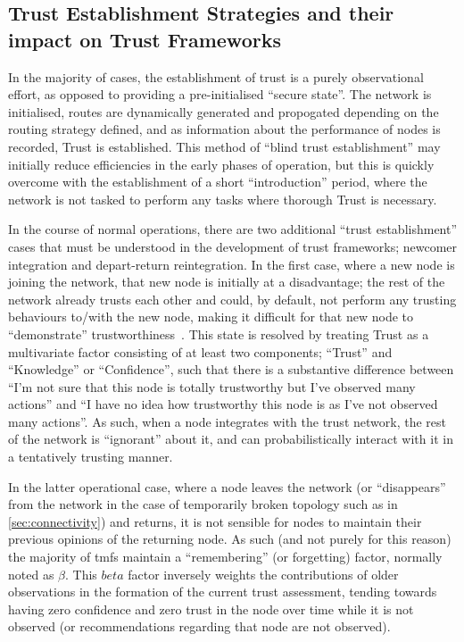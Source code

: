 \subsection{Trust Establishment Strategies and their impact on Trust Frameworks}\label{sec:trust_establishment}

In the majority of cases, the establishment of trust is a purely observational effort, as opposed to providing a pre-initialised ``secure state''\citet{Liu2006, Li2007, Theodorakopoulos2004}.
The network is initialised, routes are dynamically generated and propogated depending on the routing strategy defined, and as information about the performance of nodes is recorded, Trust is established. 
This method of ``blind trust establishment'' may initially reduce efficiencies in the early phases of operation, but this is quickly overcome with the establishment of a short ``introduction'' period, where the network is not tasked to perform any tasks where thorough Trust is necessary.

In the course of normal operations, there are two additional ``trust establishment'' cases that must be understood in the development of trust frameworks; newcomer integration and depart-return reintegration. 
In the first case, where a new node is joining the network, that new node is initially at a disadvantage; the rest of the network already trusts each other and could, by default, not perform any trusting behaviours to/with the new node, making it difficult for that new node to ``demonstrate'' trustworthiness~\cite{Li2007}.
This state is resolved by treating Trust as a multivariate factor consisting of at least two components; ``Trust'' and ``Knowledge'' or ``Confidence'', such that there is a substantive difference between ``I'm not sure that this node is totally trustworthy but I've observed many actions'' and ``I have no idea how trustworthy this node is as I've not observed many actions''.
As such, when a node integrates with the trust network, the rest of the network is ``ignorant'' about it, and can probabilistically interact with it in a tentatively trusting manner.

In the latter operational case, where a node leaves the network (or ``disappears'' from the network in the case of temporarily broken topology such as in \autoref{sec:connectivity}) and returns, it is not sensible for nodes to maintain their previous opinions of the returning node. 
As such (and not purely for this reason) the majority of \glspl{tmf} maintain a ``remembering'' (or forgetting) factor, normally noted as $\beta$.
This $beta$ factor inversely weights the contributions of older observations in the formation of the current trust assessment, tending towards having zero confidence and zero trust in the node over time while it is not observed (or recommendations regarding that node are not observed).


